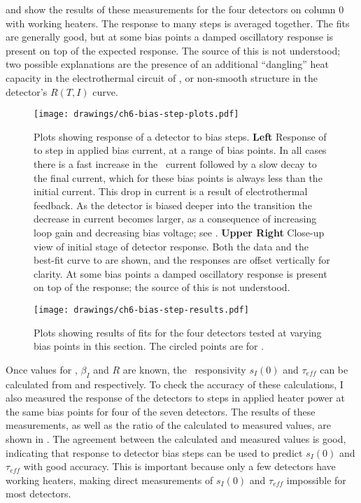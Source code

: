  and  show the results of these measurements for the four detectors on column 0 with working heaters.
The response to many steps is averaged together.
The fits are generally good, but at some bias points a damped oscillatory response is present on top of the expected  response.
The source of this is not understood; two possible explanations are the presence of an additional ``dangling'' heat capacity in the electrothermal circuit of  \cite{hoevers_thermal_2000,zink_array-compatible_2006,maasilta_complex_2012}, or non-smooth structure in the detector's $R(T,I)$ curve.

\begin{figure*}
  \centering
\texttt{[image: drawings/ch6-bias-step-plots.pdf]}
\caption[Plots showing response of a detector to bias steps]{
  Plots showing response of a detector to bias steps.
\textbf{Left}
Response of  to step in applied bias current, at a range of bias points.
In all cases there is a fast increase in the \TES\ current followed by a slow decay to the final current, which for these bias points is always less than the initial current.
This drop in current is a result of electrothermal feedback.
As the detector is biased deeper into the transition the decrease in current becomes larger, as a consequence of increasing loop gain and decreasing bias voltage; see .
\textbf{Upper Right}
Close-up view of initial stage of detector response.
Both the data and the best-fit curve to  are shown, and the responses are offset vertically for clarity.
At some bias points a damped oscillatory response is present on top of the  response; the source of this is not understood.
}
\label{fig:ch6-bias-step-plots}
\end{figure*}

\begin{figure*}
  \centering
\texttt{[image: drawings/ch6-bias-step-results.pdf]}
\caption[Results of bias step fits]{
  Plots showing results of fits for the four detectors tested at varying bias points in this section.
  The circled points are for \SOC.
}
\label{fig:ch6-bias-step-results}
\end{figure*}

Once values for \Loop, $\beta_I$ and $R$ are known, the \DC\ responsivity $s_I(0)$ and $\tau_{eff}$ can be calculated from  and  respectively.
To check the accuracy of these calculations, I also measured the response of the detectors to steps in applied heater power at the same bias points for four of the seven detectors.
The results of these measurements, as well as the ratio of the calculated to measured values, are shown in .
The agreement between the calculated and measured values is good, indicating that response to detector bias steps can be used to predict $s_I(0)$ and $\tau_{eff}$ with good accuracy.
This is important because only a few detectors have working heaters, making direct measurements of $s_I(0)$ and $\tau_{eff}$ impossible for most detectors.

